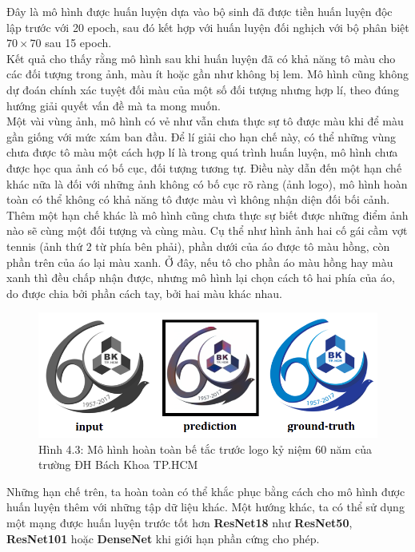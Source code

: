 \documentclass[a4paper]{article}
\begin{document}
\noindent
Đây là mô hình được huấn luyện dựa  vào bộ sinh đã được tiền huấn luyện độc lập trước với 20 epoch, sau đó kết hợp với huấn luyện đối nghịch với bộ phân biệt $70 \times 70$ sau 15 epoch.\\
Kết quả cho thấy rằng mô hình sau khi huấn luyện đã có khả năng tô màu cho các đối tượng trong ảnh, màu ít hoặc gần như không bị lem. Mô hình cũng không dự đoán chính xác tuyệt đối màu của một số đối tượng nhưng hợp lí, theo đúng hướng giải quyết vấn đề mà ta mong muốn.\\

\noindent
Một vài vùng ảnh, mô hình có vẻ như vẫn chưa thực sự tô được màu khi để màu gần giống với mức xám ban đầu. Để lí giải cho hạn chế này, có thể những vùng chưa được tô màu một cách hợp lí là trong quá trình huấn luyện, mô hình chưa được học qua ảnh có bố cục, đối tượng tương tự. Điều này dẫn đến một hạn chế khác nữa là đối với những ảnh không có bố cục rõ ràng (ảnh logo), mô hình hoàn toàn có thể không có khả năng tô được màu vì không nhận diện đối bối cảnh. Thêm một hạn chế khác là mô hình cũng chưa thực sự biết được những điểm ảnh nào sẽ cùng một đối tượng và cùng màu. Cụ thể như hình ảnh hai cố gái cầm vợt tennis (ảnh thứ 2 từ phía bên phải), phần dưới của áo được tô màu hồng, còn phần trên của áo lại màu xanh. Ở đây, nếu tô cho phần áo màu hồng hay màu xanh thì đều chấp nhận được, nhưng mô hình lại chọn cách tô hai phía của áo, do được chia bởi phần cách tay, bởi hai màu khác nhau.

\begin{figure}[h!]
\centering
\includegraphics[width=15cm]{images/4_12.PNG}
\caption{Hình 4.3: Mô hình hoàn toàn bế tắc trước logo kỷ niệm 60 năm của trường ĐH Bách Khoa TP.HCM}
\end{figure}

\noindent
Những hạn chế trên, ta hoàn toàn có thể khắc phục bằng cách cho mô hình được huấn luyện thêm với những tập dữ liệu khác. Một hướng khác, ta có thể sử dụng một mạng được huấn luyện trước tốt hơn \textbf{ResNet18} như \textbf{ResNet50}, \textbf{ResNet101} hoặc \textbf{DenseNet} khi giới hạn phần cứng cho phép.
\end{document}
